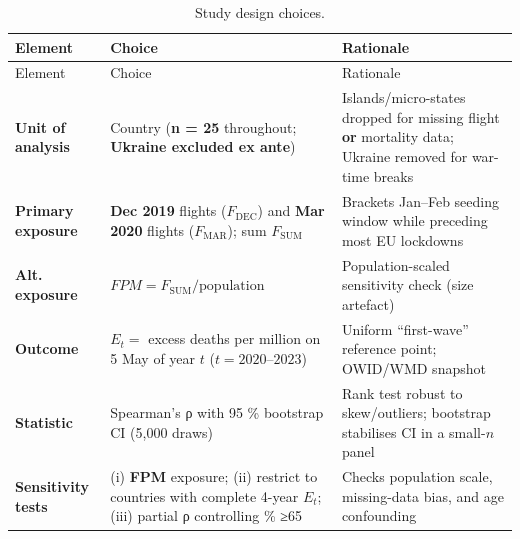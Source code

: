 \documentclass[
  authoryear,
  preprint,
  3p,
  onecolumn]{elsarticle}
\begin{document}
\begin{longtable}[]{@{}
  >{\raggedright\arraybackslash}p{}
  >{\raggedright\arraybackslash}p{}
  >{\raggedright\arraybackslash}p{}@{}}
\caption{Study design choices.}\label{tbl-design}\tabularnewline
\toprule\noalign{}
\begin{minipage}[b]{\linewidth}\raggedright
Element
\end{minipage} & \begin{minipage}[b]{\linewidth}\raggedright
Choice
\end{minipage} & \begin{minipage}[b]{\linewidth}\raggedright
Rationale
\end{minipage} \\
\midrule\noalign{}
\endfirsthead
\toprule\noalign{}
\begin{minipage}[b]{\linewidth}\raggedright
Element
\end{minipage} & \begin{minipage}[b]{\linewidth}\raggedright
Choice
\end{minipage} & \begin{minipage}[b]{\linewidth}\raggedright
Rationale
\end{minipage} \\
\midrule\noalign{}
\endhead
\bottomrule\noalign{}
\endlastfoot
\textbf{Unit of analysis} & Country (\textbf{n = 25} throughout;
\textbf{Ukraine excluded ex ante}) & Islands/micro-states dropped for
missing flight \textbf{or} mortality data; Ukraine removed for war-time
breaks \\
\textbf{Primary exposure} & \textbf{Dec 2019} flights
(\(F_{\text{DEC}}\)) and \textbf{Mar 2020} flights (\(F_{\text{MAR}}\));
sum \(F_{\text{SUM}}\) & Brackets Jan--Feb seeding window while
preceding most EU lockdowns \\
\textbf{Alt. exposure} & \(FPM = F_{\text{SUM}} / \text{population}\) &
Population-scaled sensitivity check (size artefact) \\
\textbf{Outcome} & \(E_t =\) excess deaths per million on 5 May of year
\(t\) (\(t=2020\text{–}2023\)) & Uniform ``first-wave'' reference point;
OWID/WMD snapshot \\
\textbf{Statistic} & Spearman's ρ with 95 \% bootstrap CI (5,000 draws)
& Rank test robust to skew/outliers; bootstrap stabilises CI in a
small-\(n\) panel \\
\textbf{Sensitivity tests} & (i) \textbf{FPM} exposure; (ii) restrict to
countries with complete 4-year \(E_t\); (iii) partial ρ controlling \%
≥65 & Checks population scale, missing-data bias, and age confounding \\
\end{longtable}
\end{document}
